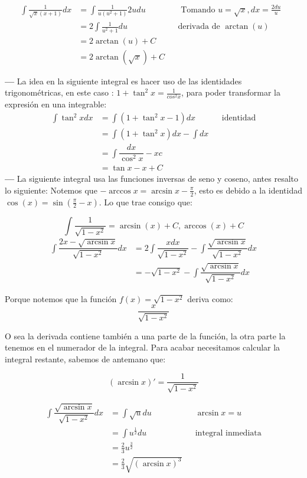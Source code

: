 \documentclass[14pt]{extarticle}
\begin{document}
\begin{align}
      \int \frac{1}{\sqrt{x}(x+1)} dx
       & = \int \frac{1}{u(u^2+1)}2udu &  & \text{ Tomando $u = \sqrt{x}, dx = \frac{2du}{u} $ } \\
       & =2 \int \frac{1}{u^2+1}du     &  & \text{derivada de $\arctan(u)$}                      \\
       & = 2\arctan(u) + C                                                                       \\
       & = 2\arctan(\sqrt{x}) + C
\end{align}

\textbf{---} La idea en la siguiente integral es hacer uso de las identidades trigonométricas, en este caso : $1+\tan^2{x} = \frac{1}{cos^2{x}}$, para poder transformar la expresión en una integrable:
\begin{align}
      \int \tan ^2xdx
       & = \int (1+\tan ^2x-1)dx       &  & \text{identidad} \\
       & = \int (1+\tan ^2x)dx-\int dx                       \\
       & =\int\dfrac{dx}{\cos ^2x}-xc                        \\
       & = \tan x-x+C
\end{align}
\textbf{---} La siguiente integral usa las funciones inversas de seno y coseno, antes resalto lo siguiente: Notemos que $-\arccos x = \arcsin x - \frac{\pi}{2}$, esto es debido a la identidad $\cos (x) = \sin(\frac{\pi}{2}-x)$. Lo que trae consigo que:

$$\int \frac{1}{\sqrt{1-x^2}} = \arcsin(x) + C, \arccos(x)+C$$
\begin{align}
      \int\dfrac{2x-\sqrt{\arcsin x}}{\sqrt{1-x^2}}dx
       & = 2\int\dfrac{xdx}{\sqrt{1-x^2}}-\int\dfrac{\sqrt{\arcsin x}}{\sqrt{1-x^2}}dx \\
       & =-\sqrt{1-x^2}-\int\dfrac{\sqrt{\arcsin x}}{\sqrt{1-x^2}}dx
\end{align}

Porque notemos que la función $f(x) = \sqrt{1-x^2}$ deriva como: $$\frac{x}{\sqrt{1-x^2}}$$

O sea la derivada contiene también a una parte de la función, la otra parte la tenemos en el numerador de la integral. Para acabar necesitamos calcular la integral restante, sabemos de antemano que:

$$(\arcsin x)' = \frac{1}{\sqrt{1-x^2}}$$

\begin{align}
      \int\dfrac{\sqrt{\arcsin x}}{\sqrt{1-x^2}}dx
       & = \int \sqrt{u}du                 &  & \text{$\arcsin x = u$}    \\
       & = \int u^\frac{1}{2}du            &  & \text{integral inmediata} \\
       & = \frac{2}{3}u^\frac{3}{2}                                       \\
       & = \frac{2}{3}\sqrt{(\arcsin x)^3}
\end{align}
\end{document}
